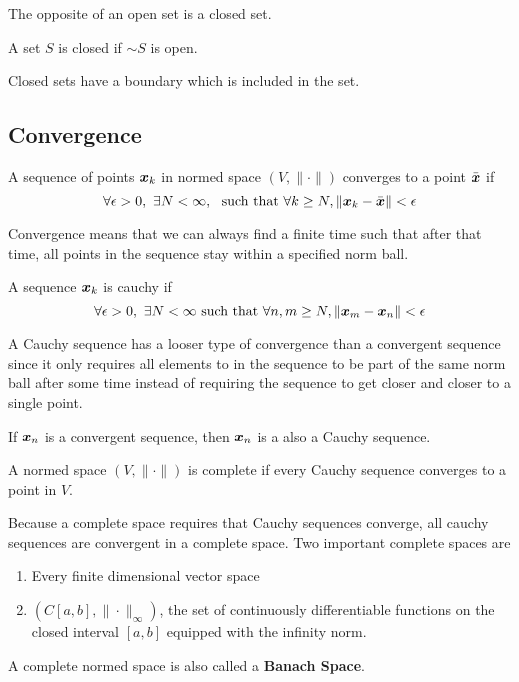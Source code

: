 The opposite of an open set is a closed set.
\begin{definition}
	A set $S$ is closed if $\sim S$ is open.
	\label{defn:closed-set}
\end{definition}
Closed sets have a boundary which is included in the set.

\subsection{Convergence}
\begin{definition}
	A sequence of points $\boldsymbol{x}_k$ in normed space $(V, \|\cdot\|)$ converges to
	a point $\bar{\boldsymbol{x}}$ if \[
		\forall \epsilon > 0,\ \exists N < \infty,\ \text{ such that } \forall k
		\geq N, \|\boldsymbol{x}_k - \bar{\boldsymbol{x}}\| < \epsilon
	\]
	\label{defn:convergence}
\end{definition}
Convergence means that we can always find a finite time such that after that
time, all points in the sequence stay within a specified norm ball.
\begin{definition}
	A sequence $\boldsymbol{x}_k$ is cauchy if \[
		\forall \epsilon > 0,\ \exists N < \infty \text{ such that } \forall n,m
		\geq N, \|\boldsymbol{x}_m - \boldsymbol{x}_n\| < \epsilon
	\]
	\label{defn:cauchy-sequence}
\end{definition}
A Cauchy sequence has a looser type of convergence than a convergent sequence
since it only requires all elements to in the sequence to be part of the same
norm ball after some time instead of requiring the sequence to get closer and
closer to a single point.
\begin{theorem}
	If $\boldsymbol{x}_n$ is a convergent sequence, then $\boldsymbol{x}_n$ is a also a Cauchy
	sequence.
	\label{thm:cauchy-convergence}
\end{theorem}
\begin{definition}
	A normed space $(V, \|\cdot\|)$ is complete if every Cauchy sequence converges
	to a point in $V$.
	\label{defn:complete-space}
\end{definition}
Because a complete space requires that Cauchy sequences converge, all cauchy
sequences are convergent in a complete space. Two important complete spaces are
\begin{enumerate}
	\item Every finite dimensional vector space
	\item $(C[a,b], \|\cdot\|_\infty)$, the set of continuously differentiable
		functions on the closed interval $[a,b]$ equipped with the infinity norm.
\end{enumerate}
A complete normed space is also called a \textbf{Banach Space}.

